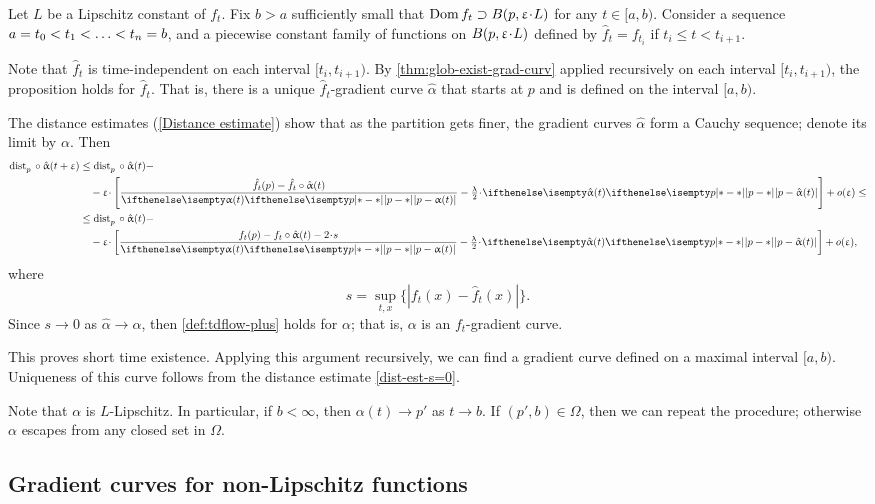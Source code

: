 Let $L$ be a Lipschitz constant of $f_t$.
Fix $b>a$ sufficiently small  that $\Dom f_t\supset B(p,\eps\cdot L)$ for any $t\in[a,b)$.
Consider a sequence  $a\z=t_0<t_1<\dots<t_n\z=b$, and a piecewise constant family of functions on $B(p,\eps\cdot L)$ defined by $\hat f_t=f_{t_i}$ if $t_i\le t<t_{i+1}$.

Note that $\hat f_t$ is time-independent on each interval $[t_i,t_{i+1})$.
By  \ref{thm:glob-exist-grad-curv} applied recursively on each interval $[t_i,t_{i+1})$,  the proposition holds for $\hat f_t$.
That is, there is a unique $\hat f_t$-gradient curve $\hat \alpha$ that starts at $p$ and is defined on the interval $[a,b)$.

The distance estimates (\ref{Distance estimate}) show that as the partition gets finer, the gradient curves $\hat\alpha$ form a Cauchy sequence; denote its limit by $\alpha$.
Then
\begin{align*}
\distfun{p}{}{}\circ\hat\alpha(t+\eps)
&\le 
\distfun{p}{}{}\circ\hat\alpha(t)-
\\
&\quad
-\eps\cdot \left[\frac{\hat f_t(p)-\hat f_t\circ\hat\alpha(t)}{\dist{p}{\alpha(t)}{}}-\tfrac\lambda2\cdot \dist{p}{\hat\alpha(t)}{}\right] 
+o(\eps)\le
\\
&\le 
\distfun{p}{}{}\circ\hat\alpha(t)-
\\
&\quad
-\eps\cdot \left[\frac{f_t(p)-f_t\circ\hat\alpha(t)-2\cdot s}{\dist{p}{\alpha(t)}{}}-\tfrac\lambda2\cdot \dist{p}{\hat\alpha(t)}{}\right]
+o(\eps),
\end{align*}
where 
\[s=\sup_{t,x} \{|f_t(x)-\hat f_t(x)|\}.\]
Since $s\to 0$ as $\hat\alpha\to \alpha$, then \ref{def:tdflow-plus} holds for $\alpha$;
that is, $\alpha$ is an $f_t$-gradient curve.

This proves short time existence.
Applying this argument recursively, we can find a gradient curve defined on a maximal interval $[a,b)$.
Uniqueness of this curve follows from the distance estimate \ref{dist-est-s=0}. 

Note that $\alpha$ is $L$-Lipschitz.
In particular, if $b<\infty$, then $\alpha(t)\to p'$ as $t\to b$.
If $(p',b)\in \Omega$, then we can repeat the procedure; otherwise $\alpha$ escapes from any closed set in $\Omega$. 
\qeds

\subsection*{Gradient curves for non-Lipschitz functions}\label{sec:non-lip}

